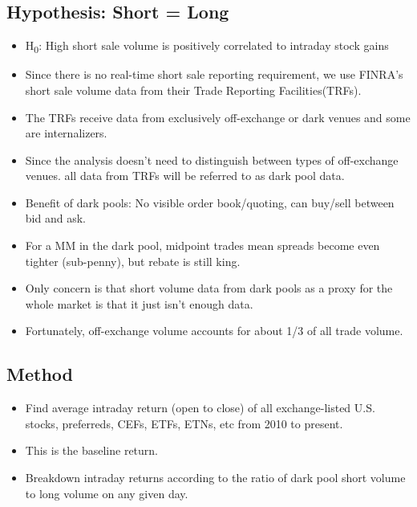 \documentclass[12pt, oneside]{article}
\begin{document}
\subsection{Hypothesis: Short = Long}

\begin{itemize}
    \item H\textsubscript{0}: High short sale volume is positively correlated to intraday stock gains
    \item Since there is no real-time short sale reporting requirement, we use FINRA's short sale volume data from their Trade Reporting Facilities(TRFs). 
    \item The TRFs receive data from exclusively off-exchange or dark venues and some are internalizers.
    \item Since the analysis doesn't need to distinguish between types of off-exchange venues. all data from TRFs will be referred to as dark pool data.
    \item Benefit of dark pools: No visible order book/quoting, can buy/sell between bid and ask.
    \item For a MM in the dark pool, midpoint trades mean spreads become even tighter (sub-penny), but rebate is still king. 
    \item Only concern is that short volume data from dark pools as a proxy for the whole market is that it just isn't enough data. 
    \item Fortunately, off-exchange volume accounts for about 1/3 of all trade volume. 
\end{itemize}

\subsection{Method}
\begin{itemize}
    \item Find average intraday return (open to close) of all exchange-listed U.S. stocks, preferreds, CEFs, ETFs, ETNs, etc from 2010 to present. 
    \item This is the baseline return.
    \item Breakdown intraday returns according to the ratio of dark pool short volume to long volume on any given day. 
\end{itemize}
\end{document}
